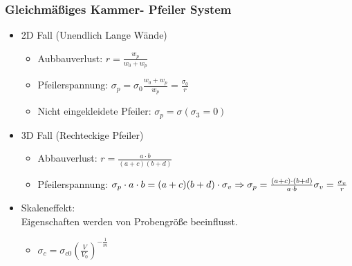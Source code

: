 \documentclass[fleqn,twoside]{article}
\begin{document}
\subsubsection{Gleichmäßiges Kammer- Pfeiler System}
\begin{minipage}{.52\textwidth}
\begin{itemize}
    \item 2D Fall (Unendlich Lange Wände)
    \begin{itemize}
        \item Aubbauverlust: $r=\frac{w_p}{w_0+w_p}$
        \item Pfeilerspannung: $\sigma_p=\sigma_0\frac{w_0+w_p}{w_p}=\frac{\sigma_0}{r}$
        \item Nicht eingekleidete Pfeiler: $\sigma_p = \sigma(\sigma_3=0) $
    \end{itemize}
    \item 3D Fall (Rechteckige Pfeiler)
    \begin{itemize}
        \item Abbauverlust: $r=\frac{a\cdot b}{(a+c)(b+d)}$
        \item Pfeilerspannung: $\sigma_p\cdot a\cdot b=(a+c)(b+d)\cdot \sigma_v\\\Rightarrow\sigma_p=\frac{(a+c)\cdot (b+d)}{a\cdot b}\sigma_v=\frac{\sigma_v}{r}$
    \end{itemize}
    \item Skaleneffekt:\\Eigenschaften werden von Probengröße beeinflusst.
    \begin{itemize}
        \item $\sigma_c=\sigma_{c0}\left(\frac{V}{V_0}\right)^{-\frac{1}{m}}$
    \end{itemize}
\end{itemize}
\end{minipage}
\end{document}
